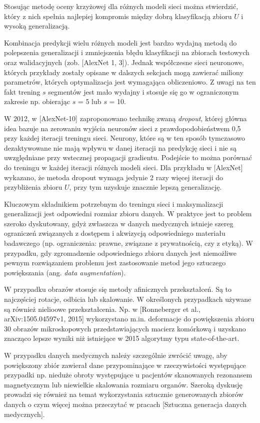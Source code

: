 Stosując metodę oceny krzyżowej dla różnych modeli sieci można stwierdzić, który z nich spełnia najlepiej kompromis między dobrą klasyfikacją zbioru $U$ i wysoką generalizacją.

Kombinacja predykcji wielu różnych modeli jest bardzo wydajną metodą do polepszenia generalizacji i zmniejszenia błędu klasyfikacji na zbiorach testowych oraz walidacyjnych (zob. [AlexNet 1, 3]). Jednak współczesne sieci neuronowe, których przykłady zostały opisane w dalszych sekcjach mogą zawierać miliony parametrów, których optymalizacja jest wymagająca obliczeniowo. Z uwagi na ten fakt trening $s$ segmentów jest mało wydajny i stosuje się go w ograniczonym zakresie np. obierając $s$ = 5 lub $s$ = 10.

W 2012, w [AlexNet-10] zaproponowano technikę zwaną \textit{dropout}, której główna idea bazuje na zerowaniu wyjścia neuronów sieci z prawdopodobieństwem 0,5 przy każdej iteracji treningu sieci. Neurony, które są w ten sposób tymczasowo dezaktywowane nie mają wpływu w danej iteracji na predykcję sieci i nie są uwzględniane przy wstecznej propagacji gradientu. Podejście to można porównać do treningu w każdej iteracji różnych modeli sieci. Dla przykładu w [AlexNet] wykazano, że metoda dropout wymaga jedynie 2 razy więcej iteracji do przybliżenia zbioru $U$, przy tym uzyskuje znacznie lepszą generalizację. 

Kluczowym składnikiem potrzebnym do treningu sieci i maksymalizacji generalizacji jest odpowiedni rozmiar zbioru danych. W praktyce jest to problem szeroko dyskutowany, gdyż zwłaszcza w danych medycznych istnieje szereg ograniczeń związanych z dostępem i akwizycją odpowiedniego materiału badawczego (np. ograniczenia: prawne, związane z prywatnością, czy z etyką). W przypadku, gdy zgromadzenie odpowiedniego zbioru danych jest niemożliwe pewnym rozwiązaniem problemu jest zastosowanie metod jego sztuczego powiększania (ang. \textit{data augmentation}).

W przypadku obrazów stosuje się metody afinicznych przekształceń. Są to najczęściej rotacje, odbicia lub skalowanie. W określonych przypadkach używane są również nielioowe przekształcenia. Np. w [Ronneberger et al., arXiv:1505.04597v1, 2015] wykorzystano m.in. deformacje do powiększenia zbioru 30 obrazów mikroskopowych przedstawiających macierz komórkową i uzyskano znacząco lepsze wyniki niż istniejące w 2015 algorytmy typu state-of-the-art.

W przypadku danych medycznych należy szczególnie zwrócić uwagę, aby powiększony zbiór zawierał dane przypominające w rzeczywistości występujące przypadki np. nieduże obroty występujące u pacjentów skanowanych rezonansem magnetycznym lub niewielkie skalowania rozmiaru organów. Szeroką dyskusję prowadzi się również na temat wykorzystania sztucznie generowanych zbiorów danych o czym więcej można przeczytać w pracach [Sztuczna generacja danych medycznych]. 



